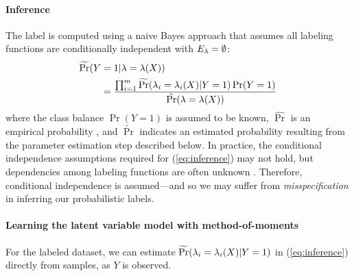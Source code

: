 \paragraph{Inference} The label is computed using a naive Bayes approach that assumes all labeling functions are conditionally independent with $E_{\lambda} = \emptyset$:
\begin{align}
    \widetilde{\Pr}(Y &= 1 | \lambda = \lambda(X)) \nonumber \\
    &= \frac{\prod_{i = 1}^m \widetilde{\Pr}(\lambda_i = \lambda_i(X) | Y = 1) \Pr(Y = 1)}{\hat{\Pr}(\lambda = \lambda(X))} 
    \label{eq:inference}
\end{align}
where the class balance $\Pr(Y = 1)$ is assumed to be known, $\hat{\Pr}$ is an empirical probability
, and $\widetilde{\Pr}$ indicates an estimated probability resulting from the parameter estimation step described below. %
%
In practice, the conditional independence assumptions required for (\ref{eq:inference}) may not hold, but dependencies among labeling functions are often unknown%
. Therefore, conditional independence is assumed---and so we may suffer from \emph{misspecification} in inferring our probabilistic labels. %


\paragraph{Learning the latent variable model with method-of-moments}
For the labeled dataset, we can estimate $\widetilde{\Pr}(\lambda_i = \lambda_i(X) | Y = 1)$ in (\ref{eq:inference}) directly from samples, as $Y$ is observed. 

